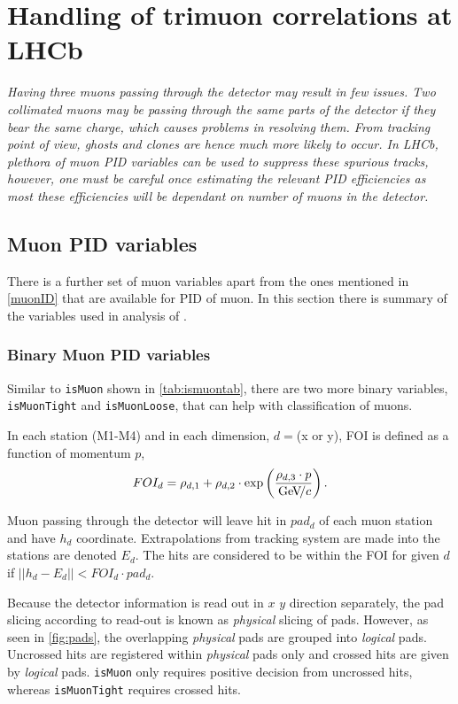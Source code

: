 \chapter{Handling of trimuon correlations at LHCb}
\label{chap:trimuon}

\textit{Having three muons passing through the detector may result in few issues. Two collimated muons may be passing through the same parts of the detector if they bear the same charge, which causes problems in resolving them. From tracking point of view, ghosts and clones are hence much more likely to occur. In LHCb, plethora of muon \Gls{PID} variables can be used to suppress these spurious tracks, however, one must be careful once estimating the relevant \gls{PID} efficiencies as most these efficiencies will be dependant on number of muons in the detector.}

\section{Muon PID variables }
There is a further set of muon variables apart from the ones mentioned in \autoref{muonID} that are available for \gls{PID} of muon. In this section there is summary of the variables used in analysis of \Bmumumu.

\subsection{Binary Muon PID variables }
Similar to \texttt{isMuon} shown in \autoref{tab:ismuontab},  there are two more binary variables, \texttt{isMuonTight} and \texttt{isMuonLoose}, that can help with classification of muons. 

In each station (M1-M4) and in each dimension, $d=$(x or y), \gls{FOI} is defined as a function of momentum $p$,
\begin{equation}
	FOI_{d}=\rho_{d,1}+\rho_{d,2}\cdot \exp \left(\frac{\rho_{d,3}\cdot p}{{\mathrm{\,Ge\kern -0.1em V\!/}c}} \right).
\end{equation}

Muon passing through the detector will leave hit in $pad_{d}$ of each muon station and have $h_{d}$ coordinate. Extrapolations from tracking system are made into the stations are denoted $E_{d}$. The hits are considered to be within the \gls{FOI} for given $d$ if $|| h_{d} - E_{d} || < FOI_{d} \cdot pad_{d}$. 

Because the detector information is read out in $x$ $y$ direction separately, the pad slicing according to read-out is known as \textit{physical} slicing of pads. However, as seen in \autoref{fig:pads}, the overlapping \textit{physical} pads are grouped into \textit{logical} pads. Uncrossed hits are registered within \textit{physical} pads only and crossed hits are given by \textit{logical} pads. \texttt{isMuon} only requires positive decision from uncrossed hits, whereas \texttt{isMuonTight} requires crossed hits. 


